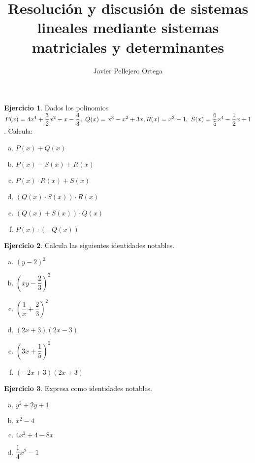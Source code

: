 \documentclass[11pt, oneside]{book}
\title{Resolución y discusión de sistemas lineales mediante sistemas matriciales y determinantes}
\author{Javier Pellejero Ortega}
\theoremstyle{definition} %
\newtheorem{ejercicio}{Ejercicio}
\begin{document}
\begin{ejercicio} Dados los polinomios $P(x)=4x^4+\dfrac{3}{2}x^2-x-\dfrac{4}{3},\ Q(x)=x^3-x^2+3x,\\R(x)= x^3 - 1,\ S(x)= \dfrac{6}{5}x^4-\dfrac{1}{2}x+1$. Calcula:
\begin{multicols}{2}
\begin{enumerate}[a)]
    \item $P(x)+Q(x)$
    \item $P(x)-S(x)+R(x)$
    \item $P(x)\cdot R(x) + S(x)$
    \item $(Q(x)\cdot S(x))\cdot R(x)$
    \item $(Q(x)+S(x)) \cdot Q(x)$
    \item $P(x)\cdot(-Q(x))$
\end{enumerate}
\end{multicols}
\end{ejercicio}

\begin{ejercicio} Calcula las siguientes identidades notables.
\begin{multicols}{2}
\begin{enumerate}[a)]
    \item $(y-2)^2$
    \item $\left(xy-\dfrac{2}{3}\right)^2$
    \item $\left(\dfrac{1}{x}+\dfrac{2}{3}\right)^2$
    \item $(2x+3)(2x-3)$
    \item $\left(3x+\dfrac{1}{5}\right)^2$
    \item $(-2x+3)(2x+3)$
\end{enumerate}
\end{multicols}
\end{ejercicio}

\begin{ejercicio} Expresa como identidades notables.
\begin{multicols}{2}
\begin{enumerate}[a)]
    \item $y^2 +2y +1$
    \item $x^2-4$
    \item $4x^2+4-8x$
    \item $\dfrac{1}{4}x^2-1$
\end{enumerate}
\end{multicols}
\end{ejercicio}
\end{document}

